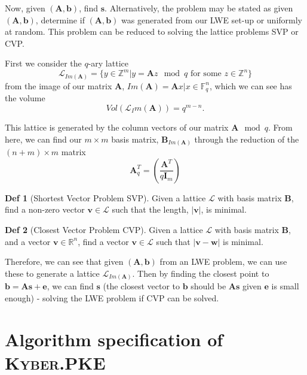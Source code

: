 \documentclass[a4paper, 10pt]{article}
\theoremstyle{definition}
\newtheorem{definition}{Def}[section]
\begin{document}
Now, given $(\mathbf{A},\mathbf{b})$, find $\mathbf{s}$. Alternatively, the problem may be stated as given $(\mathbf{A},\mathbf{b})$, determine if $(\mathbf{A},\mathbf{b})$ was generated from our LWE set-up or uniformly at random. This problem can be reduced to solving the lattice problems \ac{SVP} or \ac{CVP}.\par  

First we consider the  $q$-ary lattice
\[\mathcal{L}_{Im(\mathbf{A})}=\{y \in \mathbb{Z}^m | y=\mathbf{A}z\mod{q} \mbox{ for some } z \in \mathbb{Z}^n \}\]
from the image of our matrix $\mathbf{A}$, $Im(\mathbf{A})={\mathbf{A}x|x\in \mathbb{F}_q^n}$, which we can see has the volume
\[Vol(\mathcal{L}_Im(\mathbf{A}))=q^{m-n}\text{.}\]

This lattice is generated by the column vectors of our matrix $\mathbf{A}\mod{q}$. From here, we can find our $m \times m$ basis matrix, $\textbf{B}_{Im(\textbf{A})}$ through the reduction of the $(n+m) \times m$ matrix
\[\mathbf{A}^T_q = (\frac{\mathbf{A}^T}{q\mathbf{I}_m})\]

\begin{definition}[Shortest Vector Problem \ac{SVP}]
    Given a lattice $\mathcal{L}$ with basis matrix $\textbf{B}$, find a non-zero vector $\mathbf{v} \in \mathcal{L}$ such that the length, $|\mathbf{v}|$, is minimal.
\end{definition}

\begin{definition}[Closest Vector Problem \ac{CVP}]
    Given a lattice $\mathcal{L}$ with basis matrix $\textbf{B}$, and a vector $\mathbf{v} \in \mathbb{R}^n$, find a vector $\mathbf{v} \in \mathcal{L}$ such that $|\mathbf{v} - \mathbf{w}|$ is minimal.
\end{definition}

Therefore, we can see that given $(\mathbf{A}, \mathbf{b})$ from an LWE problem, we can use these to generate a lattice $\mathcal{L}_{Im(\mathbf{A})}$. Then by finding the closest point to $\mathbf{b} = \mathbf{As} + \mathbf{e}$, we can find $\mathbf{s}$ (the closest vector to $\mathbf{b}$ should be $\mathbf{As}$ given $\mathbf{e}$ is small enough) - solving the LWE problem if CVP can be solved.

\newpage

\section{Algorithm specification of \textsc{Kyber}.PKE}
\end{document}
